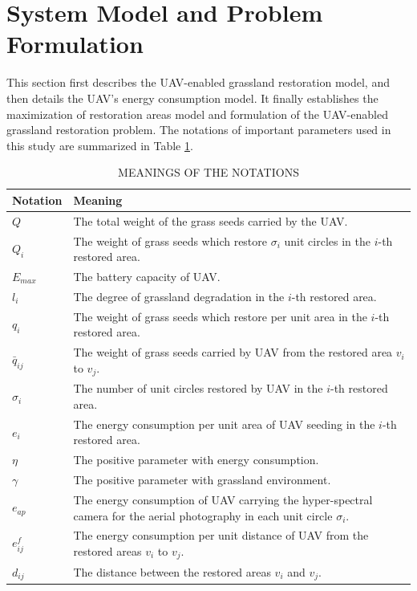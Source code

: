 \documentclass[preprint,5pt]{elsarticle}
\begin{document}
\section{System Model and Problem Formulation} \label{System-Model}
This section first describes the UAV-enabled grassland restoration model, and then details the UAV's energy consumption model. It finally establishes the maximization of restoration areas model and formulation of the UAV-enabled grassland restoration problem. The notations of important parameters used in this study are summarized in Table \ref{tab1}.
\begin{table}[htbp]
 \caption{MEANINGS OF THE NOTATIONS}\label{tab1}
 \vspace{0.1in}
 \begin{tabular}{m{50pt}<{\raggedright} m{420pt}<{\raggedright}}%
  \toprule
  Notation                & Meaning  \\
  \midrule
 $Q$                 & The total weight of the grass seeds carried by the UAV.  \\
 $Q_i$               & The weight of grass seeds which restore $\sigma_i$ unit circles in the $i$-th restored area. \\
 $E_{max}$           & The battery capacity of UAV.  \\
 $l_i$               & The degree of grassland degradation in the $i$-th restored area.\\
 $q_i$               & The weight of grass seeds which restore per unit area in the $i$-th restored area. \\
 $\bar{q}_{ij}$      & The weight of grass seeds carried by UAV from the restored area $v_i$ to $v_j$.  \\
 $\sigma_i$          & The number of unit circles restored by UAV in the $i$-th restored area.\\
 $e_i$               & The energy consumption per unit area of UAV seeding in the $i$-th restored area.  \\
 $\eta$              & The positive parameter with energy consumption.  \\
 $\gamma$            & The positive parameter with grassland environment.  \\
 $e_{ap}$            & The energy consumption of UAV carrying the hyper-spectral camera for the aerial photography in each unit circle $\sigma_i$.     \\
 $e^f_{ij}$          & The energy consumption per unit distance of UAV from the restored areas $v_i$ to $v_j$.  \\
 $d_{ij}$            & The distance between the restored areas $v_i$ and $v_j$.  \\
  \bottomrule
 \end{tabular}
\end{table}
\end{document}
